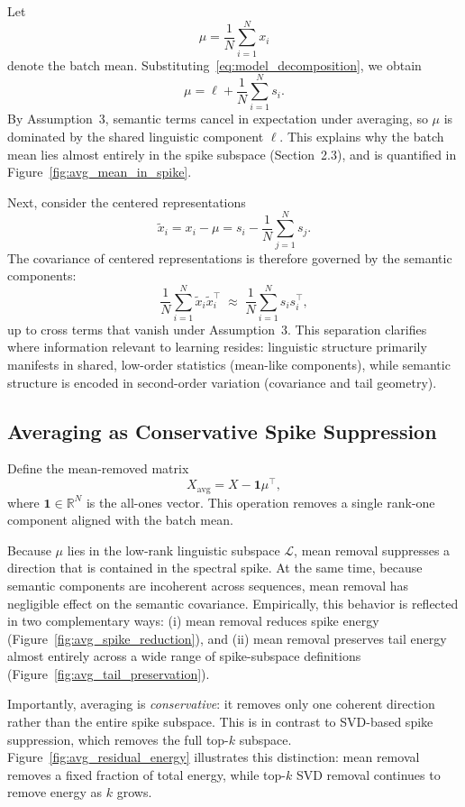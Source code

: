 Let
\[
\mu = \frac{1}{N} \sum_{i=1}^N x_i
\]
denote the batch mean.
Substituting~\eqref{eq:model_decomposition}, we obtain
\[
\mu = \ell + \frac{1}{N} \sum_{i=1}^N s_i.
\]
By Assumption~3, semantic terms cancel in expectation under averaging, so $\mu$
is dominated by the shared linguistic component $\ell$.
This explains why the batch mean lies almost entirely in the spike subspace
(Section~2.3), and is quantified in Figure~\ref{fig:avg_mean_in_spike}.

Next, consider the centered representations
\[
\tilde{x}_i = x_i - \mu = s_i - \frac{1}{N} \sum_{j=1}^N s_j.
\]
The covariance of centered representations is therefore governed by the semantic
components:
\[
\frac{1}{N} \sum_{i=1}^N \tilde{x}_i \tilde{x}_i^\top
\;\approx\;
\frac{1}{N} \sum_{i=1}^N s_i s_i^\top,
\]
up to cross terms that vanish under Assumption~3.
This separation clarifies where information relevant to learning resides:
linguistic structure primarily manifests in shared, low-order statistics
(mean-like components), while semantic structure is encoded in second-order
variation (covariance and tail geometry).

\subsection{Averaging as Conservative Spike Suppression}

Define the mean-removed matrix
\[
X_{\mathrm{avg}} = X - \mathbf{1}\mu^\top,
\]
where $\mathbf{1} \in \mathbb{R}^N$ is the all-ones vector.
This operation removes a single rank-one component aligned with the batch mean.

Because $\mu$ lies in the low-rank linguistic subspace $\mathcal{L}$, mean removal
suppresses a direction that is contained in the spectral spike.
At the same time, because semantic components are incoherent across sequences,
mean removal has negligible effect on the semantic covariance.
Empirically, this behavior is reflected in two complementary ways:
(i) mean removal reduces spike energy (Figure~\ref{fig:avg_spike_reduction}),
and (ii) mean removal preserves tail energy almost entirely across a wide range
of spike-subspace definitions (Figure~\ref{fig:avg_tail_preservation}).

Importantly, averaging is \emph{conservative}:
it removes only one coherent direction rather than the entire spike subspace.
This is in contrast to SVD-based spike suppression, which removes the full
top-$k$ subspace.
Figure~\ref{fig:avg_residual_energy} illustrates this distinction: mean removal
removes a fixed fraction of total energy, while top-$k$ SVD removal continues to
remove energy as $k$ grows.

